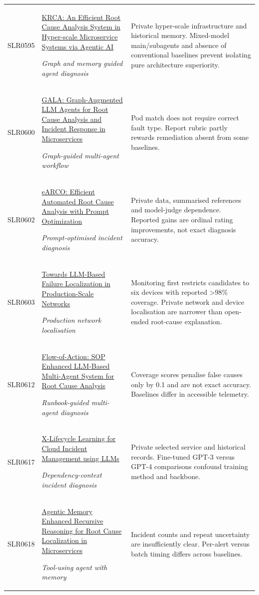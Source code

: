\begin{longtable}{@{}p{}p{}p{}@{}}
SLR0595 & \href{https://arxiv.org/pdf/2607.01788}{KRCA: An Efficient Root Cause Analysis System in Hyper-scale Microservice Systems via Agentic AI}\par\emph{Graph and memory guided agent diagnosis} & Private hyper-scale infrastructure and historical memory. Mixed-model main/subagents and absence of conventional baselines prevent isolating pure architecture superiority. \\
SLR0600 & \href{https://arxiv.org/pdf/2608.08968}{GALA: Graph-Augmented LLM Agents for Root Cause Analysis and Incident Response in Microservices}\par\emph{Graph-guided multi-agent workflow} & Pod match does not require correct fault type. Report rubric partly rewards remediation absent from some baselines. \\
SLR0602 & \href{https://arxiv.org/pdf/2504.11505}{eARCO: Efficient Automated Root Cause Analysis with Prompt Optimization}\par\emph{Prompt-optimised incident diagnosis} & Private data, summarised references and model-judge dependence. Reported gains are ordinal rating improvements, not exact diagnosis accuracy. \\
SLR0603 & \href{https://grace-liu.github.io/static/papers/25-SIGCOMM-bian.pdf}{Towards LLM-Based Failure Localization in Production-Scale Networks}\par\emph{Production network localisation} & Monitoring first restricts candidates to six devices with reported >98\% coverage. Private network and device localisation are narrower than open-ended root-cause explanation. \\
SLR0612 & \href{https://arxiv.org/pdf/2502.08224}{Flow-of-Action: SOP Enhanced LLM-Based Multi-Agent System for Root Cause Analysis}\par\emph{Runbook-guided multi-agent diagnosis} & Coverage scores penalise false causes only by 0.1 and are not exact accuracy. Baselines differ in accessible telemetry. \\
SLR0617 & \href{https://arxiv.org/pdf/2404.03662}{X-Lifecycle Learning for Cloud Incident Management using LLMs}\par\emph{Dependency-context incident diagnosis} & Private selected service and historical records. Fine-tuned GPT-3 versus GPT-4 comparisons confound training method and backbone. \\
SLR0618 & \href{https://arxiv.org/pdf/2601.02732}{Agentic Memory Enhanced Recursive Reasoning for Root Cause Localization in Microservices}\par\emph{Tool-using agent with memory} & Incident counts and repeat uncertainty are insufficiently clear. Per-alert versus batch timing differs across baselines. \\

\end{longtable}
